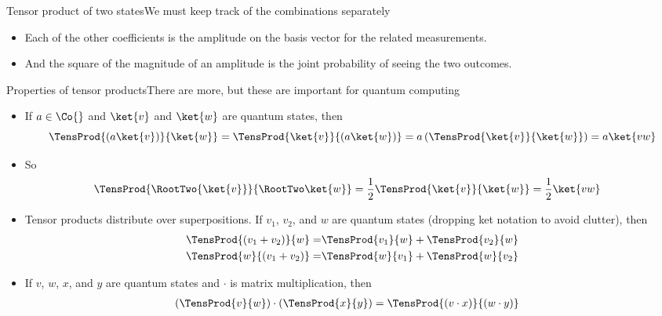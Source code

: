 \begin{frame}{Tensor product of two states}{We must keep track of the combinations separately}
{{\begin{itemize}
    \item Each of the other coefficients is the amplitude on the basis vector for the related measurements.
    \item And the square of the magnitude of an amplitude is the joint probability of seeing the two outcomes.
\end{itemize}
}
}{%
}
\end{frame}

\begin{frame}{Properties of tensor products}{There are more, but these are important for quantum computing}
\Vskip{-3.5em}\begin{itemize}[<+->]
    \item If $a \in \Co{}$ and $\ket{v}$ and $\ket{w}$ are quantum states, then
    \[ 
       \TensProd{(a\ket{v})}{\ket{w}} = \TensProd{\ket{v}}{(a\ket{w})} = a\,(\TensProd{\ket{v}}{\ket{w}}) = a\ket{vw}
    \]
    \item So
    \Vskip{-3em}\begin{align*}
        \TensProd{\RootTwo{\ket{v}}}{\RootTwo\ket{w}} &= \frac{1}{2}\TensProd{\ket{v}}{\ket{w}} = \frac{1}{2} \ket{vw}
    \end{align*}
    \item Tensor products distribute over superpositions.  If $v_{1}$, $v_{2}$, and $w$ are quantum states (dropping ket notation to avoid clutter), then
    \begin{align*}
       \TensProd{(v_{1}+v_{2})}{w} = & \TensProd{v_{1}}{w} + \TensProd{v_{2}}{w}\\
       \TensProd{w}{(v_{1}+v_{2})} = & \TensProd{w}{v_{1}} + \TensProd{w}{v_{2}} 
    \end{align*}
    \item If $v$, $w$, $x$, and $y$ are quantum states and $\cdot$ is matrix multiplication, then
\begin{align*}
    (\TensProd{v}{w}) \cdot (\TensProd{x}{y}) &= \TensProd{(v\cdot x)}{(w\cdot y)}
\end{align*}
\end{itemize}
\end{frame}


